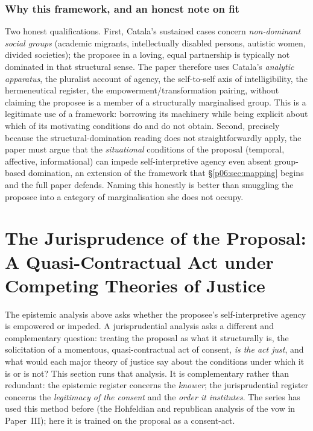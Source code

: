 \documentclass[11pt,a4paper]{article}
\begin{document}
\subsubsection{Why this framework, and an honest note on fit}

Two honest qualifications. First, Catala's sustained cases concern \emph{non-dominant social groups} (academic migrants, intellectually disabled persons, autistic women, divided societies); the proposee in a loving, equal partnership is typically not dominated in that structural sense. The paper therefore uses Catala's \emph{analytic apparatus}, the pluralist account of agency, the self-to-self axis of intelligibility, the hermeneutical register, the empowerment/transformation pairing, without claiming the proposee is a member of a structurally marginalised group. This is a legitimate use of a framework: borrowing its machinery while being explicit about which of its motivating conditions do and do not obtain. Second, precisely because the structural-domination reading does not straightforwardly apply, the paper must argue that the \emph{situational} conditions of the proposal (temporal, affective, informational) can impede self-interpretive agency even absent group-based domination, an extension of the framework that §\ref{p06:sec:mapping} begins and the full paper defends. Naming this honestly is better than smuggling the proposee into a category of marginalisation she does not occupy.

\section{The Jurisprudence of the Proposal: A Quasi-Contractual Act under Competing Theories of Justice}\label{p06:sec:jurisprudence}

The epistemic analysis above asks whether the proposee's self-interpretive agency is empowered or impeded. A jurisprudential analysis asks a different and complementary question: treating the proposal as what it structurally is, the solicitation of a momentous, quasi-contractual act of consent, \emph{is the act just}, and what would each major theory of justice say about the conditions under which it is or is not? This section runs that analysis. It is complementary rather than redundant: the epistemic register concerns the \emph{knower}; the jurisprudential register concerns the \emph{legitimacy of the consent} and the \emph{order it institutes}. The series has used this method before (the Hohfeldian and republican analysis of the vow in Paper~III); here it is trained on the proposal as a consent-act.
\end{document}
